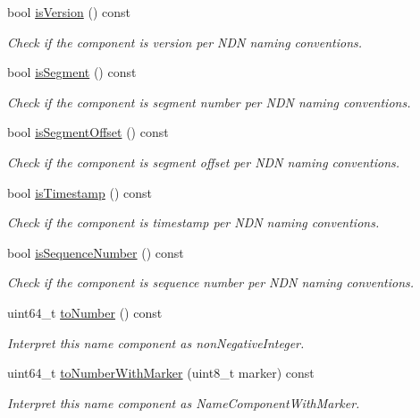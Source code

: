 \begin{DoxyCompactItemize}
bool \hyperlink{classndn_1_1name_1_1Component_aa6b97277b8e99d24e5e84856effc8c71}{is\+Version} () const
\begin{DoxyCompactList}\small\item\em Check if the component is version per N\+DN naming conventions. \end{DoxyCompactList}\item 
bool \hyperlink{classndn_1_1name_1_1Component_a32622d5d2cdc51bba6ee1895e85a2ad4}{is\+Segment} () const
\begin{DoxyCompactList}\small\item\em Check if the component is segment number per N\+DN naming conventions. \end{DoxyCompactList}\item 
bool \hyperlink{classndn_1_1name_1_1Component_aaa54289dae0f25ff3e26e0cced0061fa}{is\+Segment\+Offset} () const
\begin{DoxyCompactList}\small\item\em Check if the component is segment offset per N\+DN naming conventions. \end{DoxyCompactList}\item 
bool \hyperlink{classndn_1_1name_1_1Component_a56201e898870ea292e374c8f29506902}{is\+Timestamp} () const
\begin{DoxyCompactList}\small\item\em Check if the component is timestamp per N\+DN naming conventions. \end{DoxyCompactList}\item 
bool \hyperlink{classndn_1_1name_1_1Component_a782ced113da5879112fa66557822220b}{is\+Sequence\+Number} () const
\begin{DoxyCompactList}\small\item\em Check if the component is sequence number per N\+DN naming conventions. \end{DoxyCompactList}\item 
uint64\+\_\+t \hyperlink{classndn_1_1name_1_1Component_aec06747cc8f5566cccf308fe4916d3b7}{to\+Number} () const
\begin{DoxyCompactList}\small\item\em Interpret this name component as non\+Negative\+Integer. \end{DoxyCompactList}\item 
uint64\+\_\+t \hyperlink{classndn_1_1name_1_1Component_a494076d15fe1b6e4b4717b8f466e7c8a}{to\+Number\+With\+Marker} (uint8\+\_\+t marker) const
\begin{DoxyCompactList}\small\item\em Interpret this name component as Name\+Component\+With\+Marker. \end{DoxyCompactList}\item 

\end{DoxyCompactItemize}
